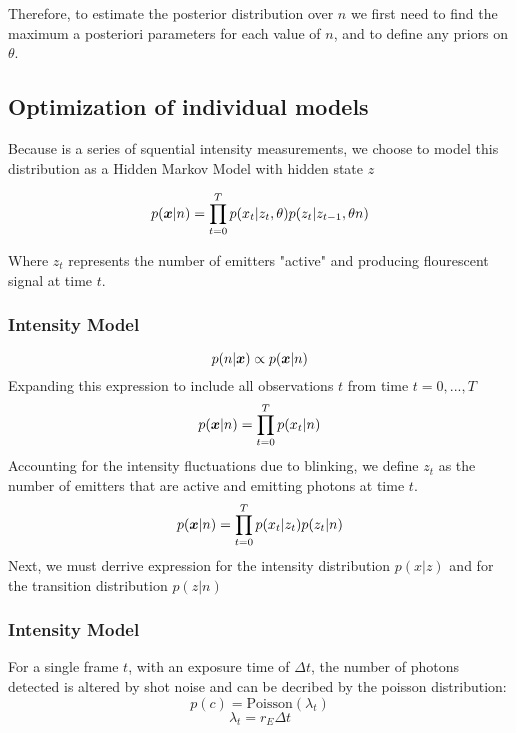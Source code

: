 Therefore, to estimate the posterior distribution over $n$ we first need to find the maximum a posteriori parameters for each value of $n$,
and to define any priors on $\theta$.

\subsection{Optimization of individual models}

Because \trace is a series of squential intensity measurements, we choose to model this distribution as a Hidden Markov Model with hidden state $z$

\begin{equation}
  p(\bm{x}| n) = \prod_{t=0}^{T} p(x_{t} | z_{t}, \theta) p(z_{t} | z_{t-1}, \theta n)
  \label{eq:method:base}
\end{equation}

Where $z_{t}$ represents the number of emitters "active" and producing flourescent signal at time $t$.

\subsubsection{Intensity Model}
%
\begin{equation*}
  p(n | \bm{x}) \propto p(\bm{x}| n)
\end{equation*}
%
Expanding this expression to include all observations $t$ from time $t=0,...,T$
%
\begin{equation*}
  p(\bm{x}| n) = \prod_{t=0}^{T} p(x_{t} | n)
\end{equation*}
%
Accounting for the intensity fluctuations due to blinking, we define $z_{t}$ as the number of emitters that are active and emitting photons at time $t$.
%
\begin{equation}
  p(\bm{x}| n) = \prod_{t=0}^{T} p(x_{t} | z_{t}) p(z_{t} | n)
  \label{eq:method:base}
\end{equation}
%
Next, we must derrive expression for the intensity distribution $p(x | z)$ and for the transition distribution $p(z | n)$

\subsubsection{Intensity Model}

For a single frame $t$, with an exposure time of $\Delta t$, the number of photons detected is altered by shot noise and can be decribed by the poisson distribution:
%
\begin{equation*}
  p(c) = \text{Poisson}(\lambda_{t})
\end{equation*}
\begin{equation*}
  \lambda_{t} = r_{E} \Delta t
\end{equation*}


